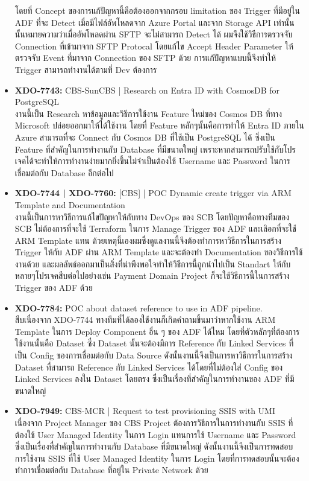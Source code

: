\begin{itemize}
            โดยที่ Concept ของการแก้ปัญหานี้คือต้องออกจากกรอบ limitation ของ Trigger ที่มีอยู่ใน ADF ที่จะ Detect เมื่อมีไฟล์อัพโหลดจาก Azure Portal และจาก Storage API เท่านั้น นั้นหมายความว่าเมื่ออัพโหลดผ่าน SFTP จะไม่สามารถ Detect ได้ ผมจึงใช้วิธีการตรวจจับ Connection ที่เข้ามาจาก SFTP Protocal โดยแก้ไข Accept Header Parameter ให้ตรวจจับ Event ที่มาจาก Connection ของ SFTP ด้วย การแก้ปัญหาแบบนี้จึงทำให้ Trigger สามารถทำงานได้ตามที่ Dev ต้องการ
      \item \textbf{XDO-7743:} CBS-SunCBS | Research on Entra ID with CosmosDB for PostgreSQL\\
            งานนี้เป็น Research หาข้อมูลและวิธีการใช้งาน Feature ใหม่ของ Cosmos DB ที่ทาง Microsoft ปล่อยออกมาให้ได้ใช้งาน โดยที่ Feature หลักๆนั้นคือการทำให้ Entra ID ภายใน Azure สามารถที่จะ Connect กับ Cosmos DB ที่ใช้เป็น PostgreSQL ได้ ซึ่งเป็น Feature ที่สำคัญในการทำงานกับ Database ที่มีขนาดใหญ่ เพราะหากสามารถปรับใช้กับโปรเจคได้จะทำให้การทำงานง่ายมากยิ่งขึ้นไม่จำเป็นต้องใช้ Username และ Password ในการเชื่อมต่อกับ Database อีกต่อไป
      \item \textbf{XDO-7744 | XDO-7760:} [CBS] | POC Dynamic create trigger via ARM Template and Documentation\\
            งานนี้เป็นการหาวิธีการแก้ไขปัญหาให้กับทาง DevOps ของ SCB โดยปัญหาคือทางทีมของ SCB ไม่ต้องการที่จะใช้ Terraform ในการ Manage Trigger ของ ADF และเลิอกที่จะใช้ ARM Template แทน ด้วยเหตุนี้เองผมซึ่งดูแลงานนี้จึงต้องทำการหาวิธีการในการสร้าง Trigger ให้กับ ADF ผ่าน ARM Template และจะต้องทำ Documentation ของวิธีการใช้งานด้วย และผลลัพธ์ออกมาเป็นสิ่งที่น่าพึงพอใจทำให้วิธีการนี้ถูกนำไปเป็น Standart ให้กับหลายๆโปรเจคสืบต่อไปอย่างเช่น Payment Domain Project ก็จะใช้วิธีการนี้ในการสร้าง Trigger ของ ADF ด้วย
      \item \textbf{XDO-7784:} POC about dataset reference to use in ADF pipeline.\\
            สืบเนื่องจาก XDO-7744 ทางทีมที่ได้ลองใช้งานก็เกิดคำถามขึ้นมาว่าหากใช้งาน ARM Template ในการ Deploy Component อื่น ๆ ของ ADF ได้ไหม โดยที่ตัวหลักๆที่ต้องการใช้งานนั้นคือ Dataset ซึ่ง Dataset นั้นจะต้องมีการ Reference กับ Linked Services ที่เป็น Config ของการเชื่อมต่อกับ Data Source ดังนั้นงานนี้จึงเป็นการหาวิธีการในการสร้าง Dataset ที่สามารถ Reference กับ Linked Services ได้โดยที่ไม่ต้องใส่ Config ของ Linked Services ลงใน Dataset โดยตรง ซึ่งเป็นเรื่องที่สำคัญในการทำงานของ ADF ที่มีขนาดใหญ่
      \item \textbf{XDO-7949:} CBS-MCR | Request to test provisioning SSIS with UMI\\
            เนื่องจาก Project Manager ของ CBS Project ต้องการวิธีการในการทำงานกับ SSIS ที่ต้องใช้ User Managed Identity ในการ Login แทนการใช้ Username และ Password ซึ่งเป็นเรื่องที่สำคัญในการทำงานกับ Database ที่มีขนาดใหญ่ ดังนั้นงานนี้จึงเป็นการทดสอบการใช้งาน SSIS ที่ใช้ User Managed Identity ในการ Login โดยที่การทดสอบนั้นจะต้องทำการเชื่อมต่อกับ Database ที่อยู่ใน Private Network ด้วย
\end{itemize}

